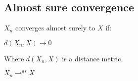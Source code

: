 
\subsection{Almost sure convergence}

\(X_n\) converges almost surely to \(X\) if:

\(d(X_n, X)\rightarrow 0\)

Where \(d(X_n, X)\) is a distance metric.

\(X_n\rightarrow^{as} X\)


